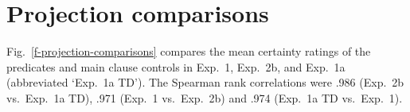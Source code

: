 \documentclass[11pt,fleqn]{article}
\newcommand{\figref}[1]{Fig.~\ref{#1}}
\newcommand{\6}{\mbox{$[\hspace*{-.6mm}[$}}
\newcommand{\9}{\mbox{$]\hspace*{-.6mm}]$}}
\begin{document}
%
%
%
%

\section{Projection comparisons}\label{a-comparison}

\figref{f-projection-comparisons} compares the mean certainty ratings of the predicates and main clause controls in Exp.~1, Exp.~2b, and  Exp.~1a (abbreviated `Exp.~1a TD'). The Spearman rank correlations were .986 (Exp.~2b vs.\ Exp.~1a TD), .971 (Exp.~1 vs.\ Exp.~2b) and .974 (Exp.~1a TD vs.\  Exp.~1).
\end{document}

